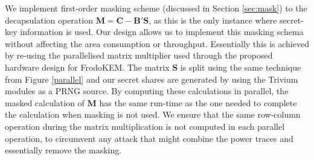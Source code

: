 We implement first-order masking scheme (discussed in Section \ref{sec:mask}) to the decapsulation operation $\mathbf{M} = \mathbf{C} - \mathbf{B}'\mathbf{S}$, as this is the only instance where secret-key information is used. Our design allows us to implement this masking schema without affecting the area consumption or throughput. Essentially this is achieved by re-using the parallelised matrix multiplier used through the proposed hardware design for FrodoKEM. The matrix $\mathbf{S}$ is split using the same technique from Figure \ref{parallel} and our secret shares are generated by using the Trivium modules as a PRNG source. By computing these calculations in parallel, the masked calculation of $\mathbf{M}$ has the same run-time as the one needed to complete the calculation when masking is not used. We ensure that the same row-column operation during the matrix multiplication is not computed in each parallel operation, to circumvent any attack that might combine the power traces and essentially remove the masking.